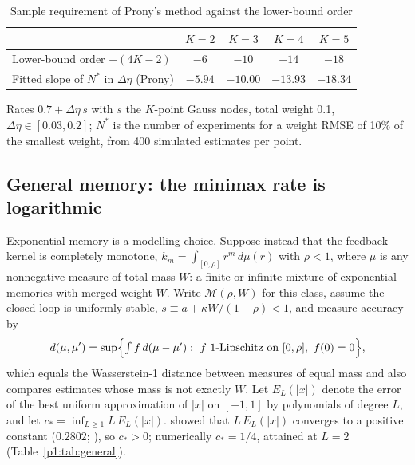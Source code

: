 \begin{table}[t]\centering\small
\begin{threeparttable}
\caption{Sample requirement of Prony's method against the lower-bound order}\label{p1:tab:kupper}
\begin{tabular}{lcccc}
\toprule
 & $K=2$ & $K=3$ & $K=4$ & $K=5$\\
\midrule
Lower-bound order $-(4K-2)$ & $-6$ & $-10$ & $-14$ & $-18$\\
Fitted slope of $N^*$ in $\Delta\eta$ (Prony) & $-5.94$ & $-10.00$ & $-13.93$ & $-18.34$\\
\bottomrule
\end{tabular}
\begin{tablenotes}\footnotesize\item Rates $0.7+\Delta\eta\,s$ with $s$ the $K$-point Gauss nodes, total weight 0.1, $\Delta\eta\in[0.03,0.2]$; $N^*$ is the number of experiments for a weight RMSE of 10\% of the smallest weight, from 400 simulated estimates per point. \end{tablenotes}
\end{threeparttable}
\end{table}

\subsection{General memory: the minimax rate is logarithmic}\label{p1:sec:general}

Exponential memory is a modelling choice. Suppose instead that the feedback kernel is completely monotone, $k_m=\int_{[0,\rho]}r^m\,d\mu(r)$ with $\rho<1$, where $\mu$ is any nonnegative measure of total mass $W$: a finite or infinite mixture of exponential memories with merged weight $W$. Write $\mathcal M(\rho,W)$ for this class, assume the closed loop is uniformly stable, $s\equiv a+\kappa W/(1-\rho)<1$, and measure accuracy by
\[
d(\mu,\mu')=\sup\Bigl\{\textstyle\int f\,d(\mu-\mu'):\ f\ \text{1-Lipschitz on }[0,\rho],\ f(0)=0\Bigr\},
\]
which equals the Wasserstein-1 distance between measures of equal mass and also compares estimates whose mass is not exactly $W$. Let $E_L(|x|)$ denote the error of the best uniform approximation of $|x|$ on $[-1,1]$ by polynomials of degree $L$, and let $c_*=\inf_{L\ge1}L\,E_L(|x|)$. \citet{p1:bernstein1914} showed that $L\,E_L(|x|)$ converges to a positive constant ($0.2802$; \citealp{p1:varga1985}), so $c_*>0$; numerically $c_*=1/4$, attained at $L=2$ (Table~\ref{p1:tab:general}).


